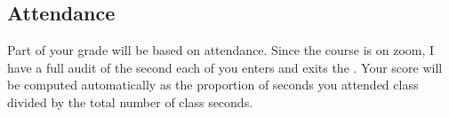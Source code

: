 \subsection*{Attendance}

Part of your grade will be based on attendance. Since the course is on zoom, I have a full audit of the second each of you enters and exits the . Your score will be computed automatically as the proportion of seconds you attended class divided by the total number of class seconds.